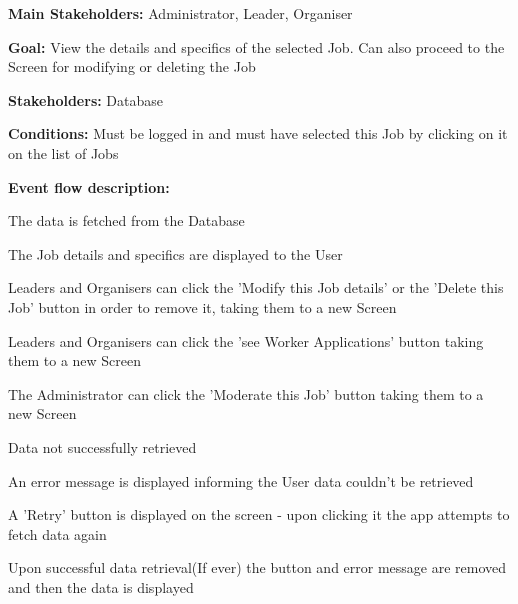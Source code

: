 				\noindent {}
				\begin{packed_item}
					\item \textbf{Main Stakeholders:} Administrator, Leader, Organiser
					\item \textbf{Goal:} View the details and specifics of the selected Job. Can also proceed to the Screen for modifying or deleting the Job
					\item \textbf{Stakeholders: } Database
					\item \textbf{Conditions: } Must be logged in and must have selected this Job by clicking on it on the list of Jobs
					\item \textbf{Event flow description: }
					\begin{packed_enum}
						\item The data is fetched from the Database
						\item The Job details and specifics are displayed to the User
						\item Leaders and Organisers can click the 'Modify this Job details' or the 'Delete this Job' button in order to remove it, taking them to a new Screen
						\item Leaders and Organisers can click the 'see Worker Applications' button taking them to a new Screen
						\item The Administrator can click the 'Moderate this Job' button taking them to a new Screen
					\end{packed_enum}
				
					\begin{packed_item}
						\item[1.a] Data not successfully retrieved
						\item[] \begin{packed_enum}
							\item An error message is displayed informing the User data couldn't be retrieved
							\item A 'Retry' button is displayed on the screen - upon clicking it the app attempts to fetch data again
							\item Upon successful data retrieval(If ever) the button and error message are removed and then the data is displayed
						\end{packed_enum}
					\end{packed_item}
				\end{packed_item}
				
